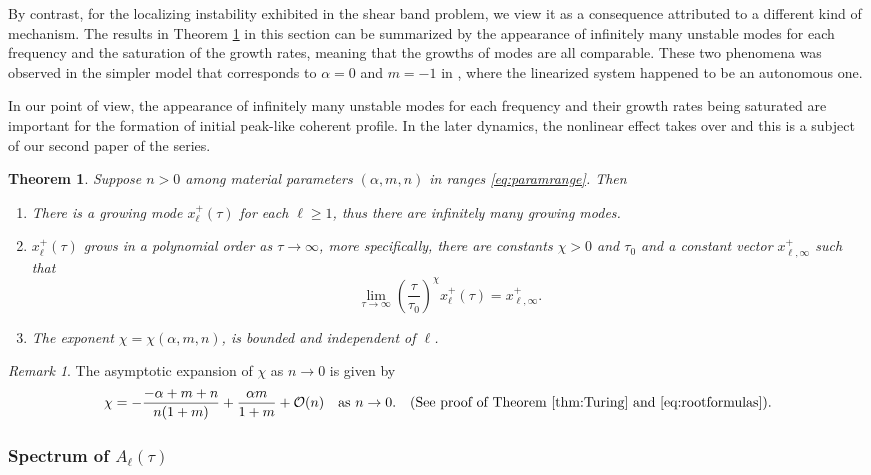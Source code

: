 \documentclass[a4paper,11pt]{article}
\newtheorem{theorem}{Theorem}
\theoremstyle{remark}
\newtheorem{remark}{Remark}[section]
\begin{document}
{By contrast, for the localizing instability exhibited in the shear band problem, we view it as a consequence attributed to a different kind of mechanism. The results in Theorem \ref{thm:Turing} in this section can be summarized by the appearance of infinitely many unstable modes for each frequency and the saturation of the growth rates, meaning that the growths of modes are all comparable. These two phenomena was observed in the simpler model that corresponds to $\alpha=0$ and $m=-1$ in \cite{KLT_16}, where the linearized system happened to be an autonomous one.

In our point of view, the appearance of infinitely many unstable modes for each frequency and their growth rates being saturated are important for the formation of initial peak-like coherent profile. In the later dynamics, the nonlinear effect takes over and this is a subject of our second paper of the series.

\begin{theorem} \label{thm:Turing} Suppose $n>0$ among material parameters $(\alpha,m,n)$ in ranges \eqref{eq:paramrange}. Then
  \begin{enumerate}
    \item There is a growing mode $x_\ell^+(\tau)$ for each $\ell\ge1$, thus there are  infinitely many growing modes.
    \item $x_\ell^+(\tau)$ grows in a polynomial order as $\tau \rightarrow \infty$, more specifically, there are constants $\chi>0$ and $\tau_0$ and a constant vector $x_{\ell,\infty}^+$ such that
    \begin{equation}
      \lim_{\tau \rightarrow \infty} \left(\frac{\tau}{\tau_0}\right)^{\chi} x_\ell^+(\tau) = x_{\ell,\infty}^+.
    \end{equation}
    \item The exponent $\chi=\chi(\alpha,m,n)$, is bounded and independent of $\ell$.
  \end{enumerate}
\end{theorem}
\begin{remark}
 The asymptotic expansion of $\chi$ as $n \rightarrow 0$ is given by
\begin{align*}
 \chi = -\frac{-\alpha+m+n}{n(1+m)} + \frac{\alpha m}{1+m} + \mathcal{O}(n) \quad \text{as } n \rightarrow 0. \quad \text{(See proof of Theorem \ref{thm:Turing} and \eqref{eq:rootformulas})}.%
\end{align*}
\end{remark}
\subsubsection{Spectrum of $A_\ell(\tau)$}

}
\end{document}
